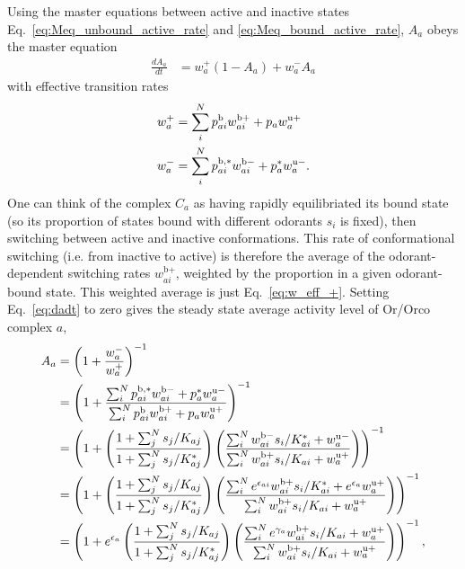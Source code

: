 \documentclass[9pt,twoside,lineno]{pnas-new}
\begin{document}
Using the master equations between active and inactive states Eq.~\ref{eq:Meq_unbound_active_rate} and \ref{eq:Meq_bound_active_rate}, $A_a$  obeys the master equation 
\begin{align}
\frac{dA_a}{dt} &= w^+_a(1 - A_a) + w^-_aA_a
\label{eq:dadt}
\end{align}
with effective transition rates
\begin{align}
w^+_a &= \sum_i^Np^{\text b}_{ai} w^{\text b +}_{ai} + p_{a}w^{\text u +}_a \label{eq:w_eff_+} \\
w^-_a &= \sum_i^Np^{\text b, *}_{ai} w^{\text b -}_{ai} + p^*_{a}w^{\text u -}_a.
\label{eq:w_eff_-}
\end{align}
One can think of the complex $C_a$ as having rapidly equilibriated its bound state (so its proportion of states bound with different odorants $s_i$ is fixed), then switching between active and inactive conformations. This rate of conformational switching (i.e. from inactive to active) is therefore the average of the odorant-dependent switching rates ${w^{\text{b}+}_{ai}}$, weighted by the proportion in a given odorant-bound state. This weighted average is just Eq.~\ref{eq:w_eff_+}. Setting Eq.~\ref{eq:dadt} to zero gives the steady state average activity level of Or/Orco complex $a$, 
\begin{align}
A_a &= \left(1 + \frac{w^-_a}{w^+_a}\right)^{-1}
\nonumber \\
&= \left(1 + \frac{\sum_i^Np^{\text b, *}_{ai} w^{\text b -}_{ai} + p^*_{a}w^{\text u -}_a}{\sum_i^Np^{\text b}_{ai} w^{\text b +}_{ai} + p_{a}w^{\text u +}_a}\right)^{-1}
\nonumber \\
&= \left(1 + \left(\frac{1 + \sum_j^Ns_j/K_{aj}}{1 + \sum_j^Ns_j/K^*_{aj}}\right)\left(\frac{\sum_i^N w_{ai}^{\textup b -} s_i/K^*_{ai} + w_a^{\textup u -}}{\sum_i^N w_{ai}^{\textup b +} s_i/K_{ai} + w_a^{\textup u +}}\right)\right)^{-1} \nonumber \\
&= \left(1 + \left(\frac{1 + \sum_j^Ns_j/K_{aj}}{1 + \sum_j^Ns_j/K^*_{aj}}\right)\left(\frac{\sum_i^N e^{\epsilon_{ai}}w_{ai}^{\textup b +} s_i/K^*_{ai} + e^{\epsilon_{a}}w_a^{\textup u +}}{\sum_i^N w_{ai}^{\textup b +} s_i/K_{ai} + w_a^{\textup u +}}\right)\right)^{-1} \nonumber \\
&= \left
(1 + e^{\epsilon_a}\left(\frac{1 + \sum_j^Ns_j/K_{aj}}{1 + \sum_j^Ns_j/K^*_{aj}}
\right)
\left(
\frac{\sum_i^N e^{\gamma_a}w_{ai}^{\textup b +} s_i/K_{ai} + w_a^{\textup u +}}{\sum_i^N w_{ai}^{\textup b +} s_i/K_{ai} + w_a^{\textup u +}}
\right)
\right)^{-1}, \nonumber 
\end{align}
\end{document}
